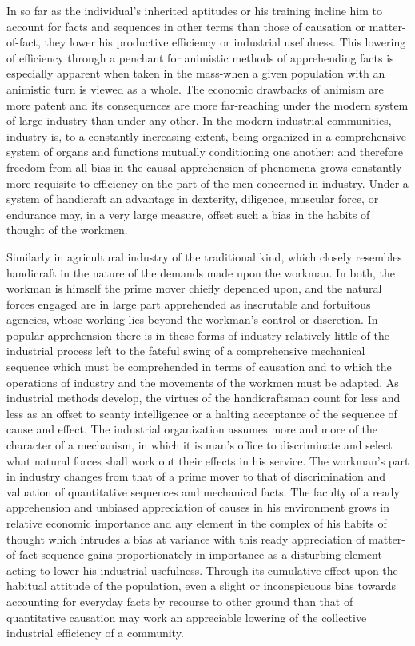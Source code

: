 \documentclass[12pt]{report}
\begin{document}
In so far as the individual's inherited aptitudes or his training
incline him to account for facts and sequences in other terms than those
of causation or matter-of-fact, they lower his productive efficiency or
industrial usefulness. This lowering of efficiency through a penchant
for animistic methods of apprehending facts is especially apparent when
taken in the mass-when a given population with an animistic turn is
viewed as a whole. The economic drawbacks of animism are more patent and
its consequences are more far-reaching under the modern system of large
industry than under any other. In the modern industrial communities,
industry is, to a constantly increasing extent, being organized in a
comprehensive system of organs and functions mutually conditioning one
another; and therefore freedom from all bias in the causal apprehension
of phenomena grows constantly more requisite to efficiency on the
part of the men concerned in industry. Under a system of handicraft an
advantage in dexterity, diligence, muscular force, or endurance may, in
a very large measure, offset such a bias in the habits of thought of the
workmen.

Similarly in agricultural industry of the traditional kind, which
closely resembles handicraft in the nature of the demands made upon
the workman. In both, the workman is himself the prime mover chiefly
depended upon, and the natural forces engaged are in large part
apprehended as inscrutable and fortuitous agencies, whose working lies
beyond the workman's control or discretion. In popular apprehension
there is in these forms of industry relatively little of the industrial
process left to the fateful swing of a comprehensive mechanical sequence
which must be comprehended in terms of causation and to which the
operations of industry and the movements of the workmen must be adapted.
As industrial methods develop, the virtues of the handicraftsman count
for less and less as an offset to scanty intelligence or a halting
acceptance of the sequence of cause and effect. The industrial
organization assumes more and more of the character of a mechanism, in
which it is man's office to discriminate and select what natural forces
shall work out their effects in his service. The workman's part in
industry changes from that of a prime mover to that of discrimination
and valuation of quantitative sequences and mechanical facts. The
faculty of a ready apprehension and unbiased appreciation of causes in
his environment grows in relative economic importance and any element in
the complex of his habits of thought which intrudes a bias at
variance with this ready appreciation of matter-of-fact sequence gains
proportionately in importance as a disturbing element acting to lower
his industrial usefulness. Through its cumulative effect upon the
habitual attitude of the population, even a slight or inconspicuous bias
towards accounting for everyday facts by recourse to other ground than
that of quantitative causation may work an appreciable lowering of the
collective industrial efficiency of a community.
\end{document}
